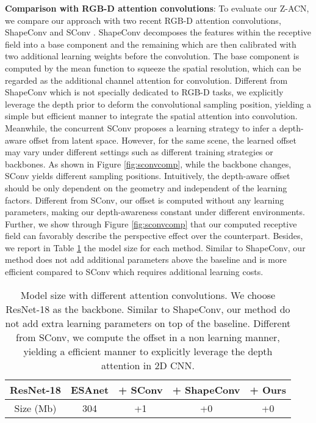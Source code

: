 \documentclass[lettersize,journal]{IEEEtran}
\begin{document}
\textbf{Comparison with RGB-D attention convolutions}: To evaluate our Z-ACN, we compare our approach with two recent RGB-D attention convolutions, ShapeConv \cite{cao2021shapeconv} and SConv \cite{chen2021spatial}. ShapeConv decomposes the features within the receptive field into a base component and the remaining which are then calibrated with two additional learning weights before the convolution. The base component is computed by the mean function to squeeze the spatial resolution, which can be regarded as the additional channel attention for convolution. Different from ShapeConv which is not specially dedicated to RGB-D tasks, we explicitly leverage the depth prior to deform the convolutional sampling position, yielding a simple but efficient manner to integrate the spatial attention into convolution. Meanwhile, the concurrent SConv proposes a learning strategy to infer a depth-aware offset from latent space. However, for the same scene, the learned offset may vary under different settings such as different training strategies or backbones. As shown in Figure \ref{fig:sconvcomp}, while the backbone changes, SConv yields different sampling positions. Intuitively, the depth-aware offset should be only dependent on the geometry and independent of the learning factors. Different from SConv, our offset is computed without any learning parameters, making our depth-awareness constant under different environments. Further, we show through Figure \ref{fig:sconvcomp} that our computed receptive field can favorably describe the perspective effect over the counterpart. Besides, we report in Table \ref{modelsize} the model size for each method. Similar to ShapeConv, our method does not add additional parameters above the baseline and is more efficient compared to SConv which requires additional learning costs.


\begin{table}[t]
\centering
\setlength\tabcolsep{3pt}
\setlength\extrarowheight{0pt}
\caption{Model size with different attention convolutions. We choose ResNet-18 as the backbone. Similar to ShapeConv, our method do not add extra learning parameters on top of the baseline. Different from SConv, we compute the offset in a non learning manner, yielding a efficient manner to explicitly leverage the depth attention in 2D CNN.}
\begin{tabular}[ht]{c |c | c| c | c }
\hline

\hline
ResNet-18 & ESAnet \cite{esanet2021icra} & + SConv \cite{chen2021spatial} & + ShapeConv \cite{cao2021shapeconv} & + Ours  \\
\hline
Size (Mb) & 304 &+1 & +0 & +0 \\
\hline

\hline

\hline
\end{tabular}
\label{modelsize}
\end{table}
\end{document}
